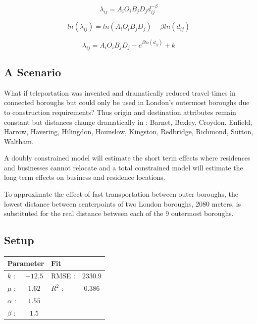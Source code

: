 \documentclass[11pt]{article} %
\begin{document}

\begin{equation}
\lambda_{ij} = A_i O_i  B_j D_j d_{ij}^{-\beta}
\end{equation}

\begin{equation}
ln(\lambda_{ij}) = ln(A_i O_i  B_j D_j) - \beta ln( d_{ij})
\end{equation}


\begin{equation}
\lambda_{ij} = A_i O_i  B_j D_j - e ^{ \beta ln( d_{ij})} + k
\end{equation}



\subsection{A Scenario}

What if teleportation  was invented and dramatically reduced travel times in connected boroughs but could only be used in London's outermost boroughs due to construction requirements? Thus origin and destination attributes remain constant but distances change dramatically in : Barnet, Bexley, Croydon, Enfield, Harrow, Havering, Hilingdon, Hounslow, Kingston, Redbridge, Richmond, Sutton, Waltham. 

A doubly constrained model will estimate the short term effects where residences and businesses cannot relocate and a total constrained model will estimate the long term effects on business and residence locations. 

To approximate the effect of fast transportation between outer boroughs, the lowest distance between centerpoints of two London boroughs, 2080 meters, is substituted for the real distance between each of the 9 outermost boroughs. 

\subsection{Setup}

\begin{table}
\centering
\begin{tabular}{lclc}
 \multicolumn{2}{l}{Parameter} 	& \multicolumn{2}{l}{Fit } \\ \hline	 
 $k$ : 		& $-12.5$ 	& RMSE :	&  $2330.9$	  	\\
 $\mu$ :	& $1.62$	& $R^2$ :	&  	$0.386$  	\\
 $\alpha$ :	& $1.55$	&  			&  	  			\\
 $\beta$ :	& $1.5$	& 	 		&
\end{tabular}
\label{unconstrained}
\end{table} 
\end{document}
